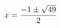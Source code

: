 \documentclass[preview]{standalone}
\begin{document}
\begin{align*}
\special{dvisvgm:raw <g id='unique000'>}x=\frac{-1\pm\sqrt{49}}{2}\special{dvisvgm:raw </g>}
\end{align*}
\end{document}

